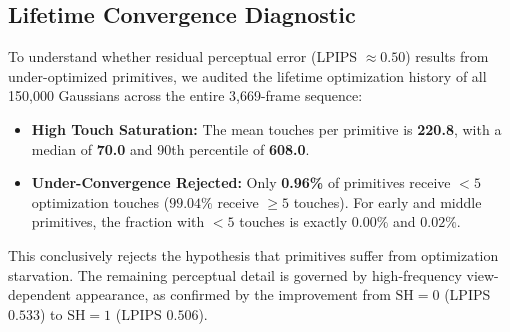 \documentclass[10pt,twocolumn,letterpaper]{article}
\begin{document}
\subsection{Lifetime Convergence Diagnostic}
To understand whether residual perceptual error (LPIPS $\approx 0.50$) results from under-optimized primitives, we audited the lifetime optimization history of all 150,000 Gaussians across the entire 3,669-frame sequence:
\begin{itemize}
\setlength{\itemsep}{1pt}
\item \textbf{High Touch Saturation:} The mean touches per primitive is \textbf{220.8}, with a median of \textbf{70.0} and 90th percentile of \textbf{608.0}.
\item \textbf{Under-Convergence Rejected:} Only \textbf{0.96\%} of primitives receive $<5$ optimization touches ($99.04\%$ receive $\ge 5$ touches). For early and middle primitives, the fraction with $<5$ touches is exactly $0.00\%$ and $0.02\%$.
\end{itemize}
This conclusively rejects the hypothesis that primitives suffer from optimization starvation. The remaining perceptual detail is governed by high-frequency view-dependent appearance, as confirmed by the improvement from $\text{SH}=0$ (LPIPS $0.533$) to $\text{SH}=1$ (LPIPS $0.506$).
\end{document}
